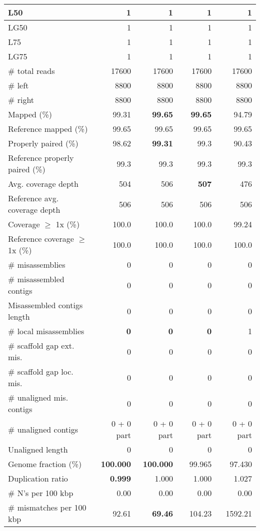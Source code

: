 \documentclass[12pt,a4paper]{article}
\begin{document}
\begin{table}[ht]
\begin{center}
\begin{tabular}{|l*{4}{|r}|}
L50 & 1 & 1 & 1 & 1 \\ \hline
LG50 & 1 & 1 & 1 & 1 \\ \hline
L75 & 1 & 1 & 1 & 1 \\ \hline
LG75 & 1 & 1 & 1 & 1 \\ \hline
\# total reads & 17600 & 17600 & 17600 & 17600 \\ \hline
\# left & 8800 & 8800 & 8800 & 8800 \\ \hline
\# right & 8800 & 8800 & 8800 & 8800 \\ \hline
Mapped (\%) & 99.31 & {\bf 99.65} & {\bf 99.65} & 94.79 \\ \hline
Reference mapped (\%) & 99.65 & 99.65 & 99.65 & 99.65 \\ \hline
Properly paired (\%) & 98.62 & {\bf 99.31} & 99.3 & 90.43 \\ \hline
Reference properly paired (\%) & 99.3 & 99.3 & 99.3 & 99.3 \\ \hline
Avg. coverage depth & 504 & 506 & {\bf 507} & 476 \\ \hline
Reference avg. coverage depth & 506 & 506 & 506 & 506 \\ \hline
Coverage $\geq$ 1x (\%) & 100.0 & 100.0 & 100.0 & 99.24 \\ \hline
Reference coverage $\geq$ 1x (\%) & 100.0 & 100.0 & 100.0 & 100.0 \\ \hline
\# misassemblies & 0 & 0 & 0 & 0 \\ \hline
\# misassembled contigs & 0 & 0 & 0 & 0 \\ \hline
Misassembled contigs length & 0 & 0 & 0 & 0 \\ \hline
\# local misassemblies & {\bf 0} & {\bf 0} & {\bf 0} & 1 \\ \hline
\# scaffold gap ext. mis. & 0 & 0 & 0 & 0 \\ \hline
\# scaffold gap loc. mis. & 0 & 0 & 0 & 0 \\ \hline
\# unaligned mis. contigs & 0 & 0 & 0 & 0 \\ \hline
\# unaligned contigs & 0 + 0 part & 0 + 0 part & 0 + 0 part & 0 + 0 part \\ \hline
Unaligned length & 0 & 0 & 0 & 0 \\ \hline
Genome fraction (\%) & {\bf 100.000} & {\bf 100.000} & 99.965 & 97.430 \\ \hline
Duplication ratio & {\bf 0.999} & 1.000 & 1.000 & 1.027 \\ \hline
\# N's per 100 kbp & 0.00 & 0.00 & 0.00 & 0.00 \\ \hline
\# mismatches per 100 kbp & 92.61 & {\bf 69.46} & 104.23 & 1592.21 \\ \hline

\end{tabular}
\end{center}
\end{table}
\end{document}
